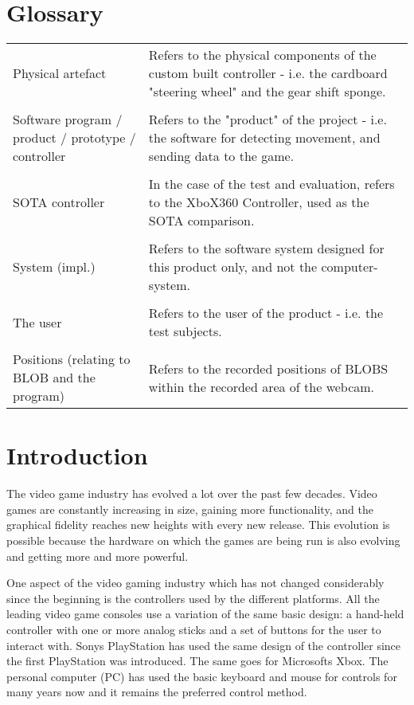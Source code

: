 \section{Glossary}
\begin{table}[!htbp]
\begin{tabular}{p{2in} p{3.4in}}
Physical artefact & Refers to the physical components of the custom built controller - i.e. the cardboard "steering wheel" and the gear shift sponge.\\
 & \\
Software program / product / prototype / controller & Refers to the "product" of the project - i.e. the software for detecting movement, and sending data to the game.\\
 & \\
SOTA controller & In the case of the test and evaluation, refers to the XboX360 Controller, used as the SOTA comparison.\\
 & \\
System (impl.) & Refers to the software system designed for this product only, and not the computer-system.\\
 & \\
The user & Refers to the user of the product - i.e. the test subjects.\\
 & \\
Positions (relating to BLOB and the program) & Refers to the recorded positions of BLOBS within the recorded area of the webcam.\\
\end{tabular}
\end{table}

\clearpage

\section{Introduction}
The video game industry has evolved a lot over the past few decades. Video games are constantly increasing in size, gaining more functionality, and the graphical fidelity reaches new heights with every new release. This evolution is possible because the hardware on which the games are being run is also evolving and getting more and more powerful.
\bigskip

One aspect of the video gaming industry which has not changed considerably since the beginning is the controllers used by the different platforms. All the leading video game consoles use a variation of the same basic design: a hand-held controller with one or more analog sticks and a set of buttons for the user to interact with. Sonys PlayStation has used the same design of the controller since the first PlayStation was introduced. The same goes for Microsofts Xbox. The personal computer (PC) has used the basic keyboard and mouse for controls for many years now and it remains the preferred control method.
\bigskip

